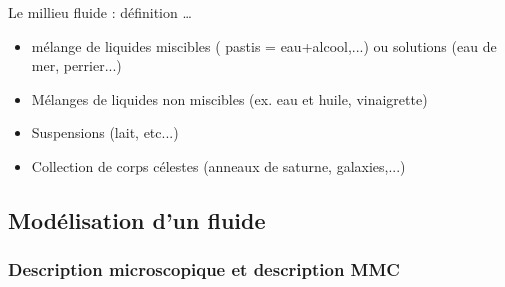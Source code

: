 \begin{frame}{Le millieu fluide : définition \ldots}
\begin{itemize}[<+-| alert@+>]
\item mélange de liquides miscibles	
	( pastis = eau+alcool,...) ou solutions (eau de mer, perrier...)

\item Mélanges de liquides non miscibles (ex. eau et huile, vinaigrette)

\item Suspensions (lait, etc...)

\item Collection de corps célestes (anneaux de saturne, galaxies,...)
	
\end{itemize}


\end{frame}



\subsection{Modélisation d'un fluide}

\subsubsection{Description microscopique et description MMC}


